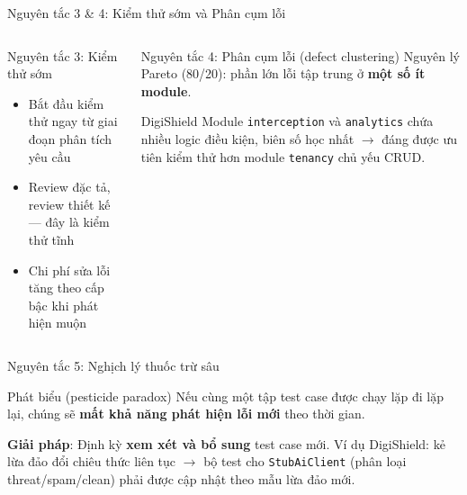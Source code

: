 \documentclass[aspectratio=169,12pt]{beamer}
\begin{document}
\begin{frame}{Nguyên tắc 3 \& 4: Kiểm thử sớm và Phân cụm lỗi}
  \begin{columns}
    \begin{block}{Nguyên tắc 3: Kiểm thử sớm}
      \begin{itemize}
        \item Bắt đầu kiểm thử ngay từ giai đoạn phân tích yêu cầu
        \item Review đặc tả, review thiết kế --- đây là kiểm thử tĩnh
        \item Chi phí sửa lỗi tăng theo cấp bậc khi phát hiện muộn
      \end{itemize}
    \end{block}

    \begin{block}{Nguyên tắc 4: Phân cụm lỗi (defect clustering)}
      Nguyên lý Pareto (80/20): phần lớn lỗi tập trung ở
      \textbf{một số ít module}.

      \vspace{0.3em}
      \begin{exampleblock}{\small DigiShield}
        \small Module \texttt{interception} và \texttt{analytics} chứa nhiều
        logic điều kiện, biên số học nhất $\to$ đáng được ưu tiên kiểm thử
        hơn module \texttt{tenancy} chủ yếu CRUD.
      \end{exampleblock}
    \end{block}
  \end{columns}
\end{frame}

\begin{frame}[fragile]{Nguyên tắc 5: Nghịch lý thuốc trừ sâu}
  \begin{block}{Phát biểu (pesticide paradox)}
    Nếu cùng một tập test case được chạy lặp đi lặp lại, chúng sẽ
    \textbf{mất khả năng phát hiện lỗi mới} theo thời gian.
  \end{block}

  \vspace{-0.2em}
  \begin{center}
  \end{center}
  \vspace{-0.4em}

  \small\textbf{Giải pháp}: Định kỳ \textbf{xem xét và bổ sung} test case mới.
  Ví dụ DigiShield: kẻ lừa đảo đổi chiêu thức liên tục $\to$ bộ test cho
  \texttt{StubAiClient} (phân loại threat/spam/clean) phải được cập nhật
  theo mẫu lừa đảo mới.
\end{frame}
\end{document}
